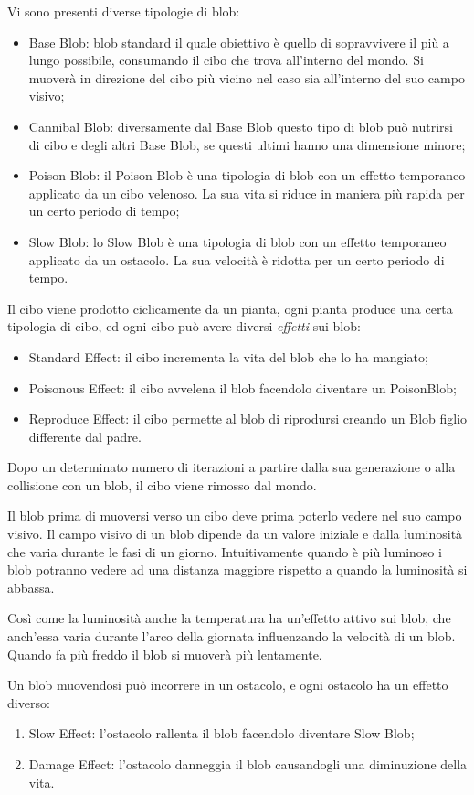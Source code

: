 Vi sono presenti diverse tipologie di blob:
\begin{itemize}
    \item Base Blob: blob standard il quale obiettivo è quello di sopravvivere il più a lungo possibile, consumando il cibo che trova all'interno del mondo. Si muoverà in direzione del cibo più vicino nel caso sia all'interno del suo campo visivo;
    \item Cannibal Blob: diversamente dal Base Blob questo tipo di blob può nutrirsi di cibo e degli altri Base Blob, se questi ultimi hanno una dimensione minore;
    \item Poison Blob: il Poison Blob è una tipologia di blob con un effetto temporaneo applicato da un cibo velenoso. La sua vita si riduce in maniera più rapida per un certo periodo di tempo;
    \item Slow Blob: lo Slow Blob è una tipologia di blob con un effetto temporaneo applicato da un ostacolo. La sua velocità è ridotta per un certo periodo di tempo.
\end{itemize}

Il cibo viene prodotto ciclicamente da un pianta, ogni pianta produce una certa tipologia di cibo, ed ogni cibo può avere diversi \textit{effetti} sui blob:
\begin{itemize}
    \item Standard Effect: il cibo incrementa la vita del blob che lo ha mangiato;
    \item Poisonous Effect: il cibo avvelena il blob facendolo diventare un PoisonBlob;
    \item Reproduce Effect: il cibo permette al blob di riprodursi creando un Blob figlio differente dal padre.
\end{itemize}
Dopo un determinato numero di iterazioni a partire dalla sua generazione o alla collisione con un blob, il cibo viene rimosso dal mondo.

Il blob prima di muoversi verso un cibo deve prima poterlo vedere nel suo campo visivo. Il campo visivo di un blob dipende da un valore iniziale e dalla luminosità che varia durante le fasi di un giorno. Intuitivamente quando è più luminoso i blob potranno vedere ad una distanza maggiore rispetto a quando la luminosità si abbassa.

Così come la luminosità anche la temperatura ha un'effetto attivo sui blob, che anch'essa varia durante l'arco della giornata influenzando la velocità di un blob. Quando fa più freddo il blob si muoverà più lentamente.

Un blob muovendosi può incorrere in un ostacolo, e ogni ostacolo ha un effetto diverso:
\begin{enumerate}
    \item Slow Effect: l'ostacolo rallenta il blob facendolo diventare Slow Blob;
    \item Damage Effect: l'ostacolo danneggia il blob causandogli una diminuzione della vita.
\end{enumerate}